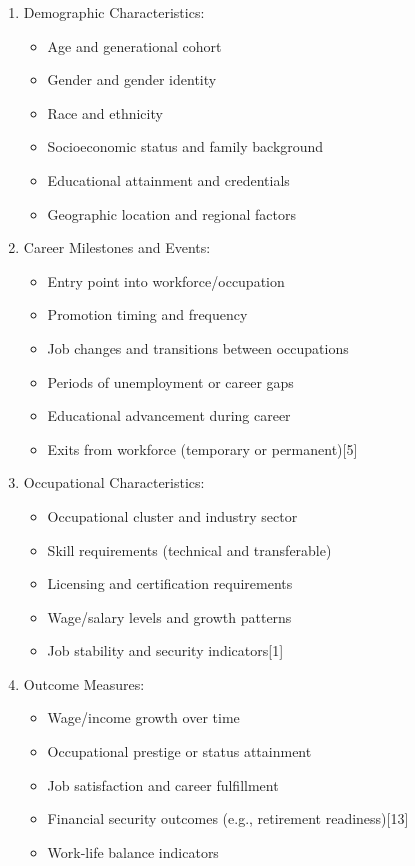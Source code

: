 \documentclass[./main.tex]{subfiles}
\begin{document}
\begin{enumerate}
\def\labelenumi{\arabic{enumi}.}
\tightlist
\item
  Demographic Characteristics:

  \begin{itemize}
  \tightlist
  \item
    Age and generational cohort
  \item
    Gender and gender identity
  \item
    Race and ethnicity
  \item
    Socioeconomic status and family background
  \item
    Educational attainment and credentials
  \item
    Geographic location and regional factors
  \end{itemize}
\item
  Career Milestones and Events:

  \begin{itemize}
  \tightlist
  \item
    Entry point into workforce/occupation
  \item
    Promotion timing and frequency
  \item
    Job changes and transitions between occupations
  \item
    Periods of unemployment or career gaps
  \item
    Educational advancement during career
  \item
    Exits from workforce (temporary or permanent){[}5{]}
  \end{itemize}
\item
  Occupational Characteristics:

  \begin{itemize}
  \tightlist
  \item
    Occupational cluster and industry sector
  \item
    Skill requirements (technical and transferable)
  \item
    Licensing and certification requirements
  \item
    Wage/salary levels and growth patterns
  \item
    Job stability and security indicators{[}1{]}
  \end{itemize}
\item
  Outcome Measures:

  \begin{itemize}
  \tightlist
  \item
    Wage/income growth over time
  \item
    Occupational prestige or status attainment
  \item
    Job satisfaction and career fulfillment
  \item
    Financial security outcomes (e.g., retirement readiness){[}13{]}
  \item
    Work-life balance indicators
  \end{itemize}
\end{enumerate}
\end{document}
